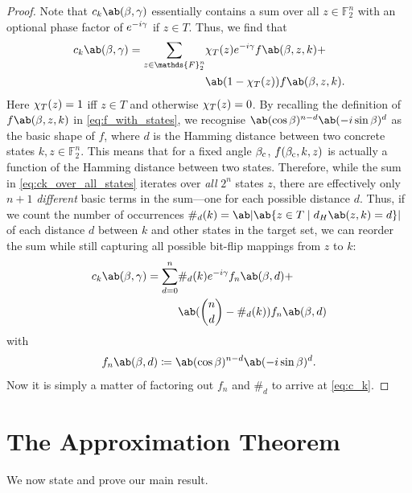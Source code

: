 \begin{proof}
    Note that $c_k\ab(\mangle,\pangle)$ essentially contains a sum over all $z \in \mathds{F}_2^n$ with an optional phase factor of $e^{-i \gamma}$ if $z \in T$. Thus, we find that
    \begin{equation}
        \label{eq:ck_over_all_states}
        \begin{aligned}
            c_k\ab(\mangle,\pangle) = \sum_{z \in \mathds{F}_2^n} &\ind_T(z) e^{-i \pangle} f\ab(\mangle, z, k) + \\
            &\ab(1 - \ind_T(z)) f\ab(\mangle, z, k).
        \end{aligned}
    \end{equation}
    Here $\chi_T(z) = 1$ iff $z \in T$ and otherwise $\chi_T(z) = 0$. By recalling the definition of $f\ab(\mangle, z, k)$ in \cref{eq:f_with_states}, we recognise $\ab(\cos \mangle)^{n - d} \ab(-i \sin \mangle)^d$ as the basic shape of $f$, where $d$ is the Hamming distance between two concrete states $k,z \in \mathds{F}_2^n$. This means that for a fixed angle $\beta_{\text{c}}$, $f(\beta_{\text{c}}, k, z)$ is actually a function of the Hamming distance between two states. Therefore, while the sum in \cref{eq:ck_over_all_states} iterates over \emph{all} $2^n$ states $z$, there are effectively only $n+1$ \emph{different} basic terms in the sum---one for each possible distance $d$. Thus, if we count the number of occurrences $\#_d (k) = \ab|\ab\{z \in T \mid d_H\ab(z,k) = d \}|$ of each distance $d$ between $k$ and other states in the target set, we can reorder the sum while still capturing all possible bit-flip mappings from $z$ to $k$:
  \begin{align*}
      c_k\ab(\mangle,\pangle) = \sum_{d = 0}^n &\#_d (k) e^{-i \pangle} f_n \ab(\mangle, d) + \\
      &\ab(\binom{n}{d} - \#_d (k)) f_n \ab(\mangle, d)
  \end{align*}
  with 
  \begin{equation}
    f_n \ab(\mangle, d) \coloneqq \ab(\cos \mangle)^{n - d} \ab(-i \sin \mangle)^d.
  \end{equation}
    Now it is simply a matter of factoring out $f_n$ and $\#_d$ to arrive at \cref{eq:c_k}.
\end{proof}

\section{The \QAOA Approximation Theorem}\label{sec:approx_thm}
We now state and prove our main result.

